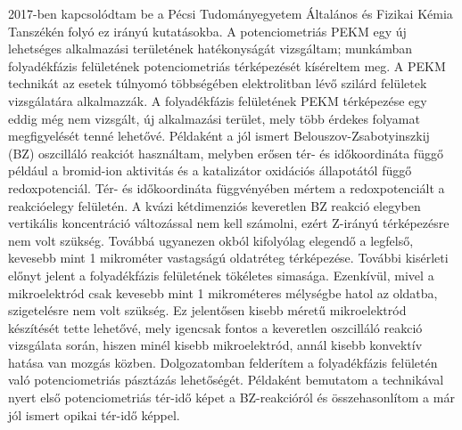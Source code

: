 2017-ben kapcsolódtam be a Pécsi Tudományegyetem Általános és Fizikai Kémia Tanszékén folyó ez irányú kutatásokba. A potenciometriás PEKM egy új lehetséges alkalmazási területének hatékonyságát vizsgáltam; munkámban folyadékfázis felületének potenciometriás térképezését kíséreltem meg. A PEKM technikát az esetek túlnyomó többségében elektrolitban lévő szilárd felületek vizsgálatára alkalmazzák. A folyadékfázis felületének PEKM térképezése egy eddig még nem vizsgált, új alkalmazási terület, mely több érdekes folyamat megfigyelését tenné lehetővé. Példaként a jól ismert Belouszov-Zsabotyinszkij (BZ) oszcilláló reakciót használtam, melyben erősen tér- és időkoordináta függő például a bromid-ion aktivitás és a katalizátor oxidációs állapotától függő redoxpotenciál. Tér- és időkoordináta függvényében mértem a redoxpotenciált a reakcióelegy felületén. A kvázi kétdimenziós keveretlen BZ reakció elegyben vertikális koncentráció változással nem kell számolni, ezért Z-irányú térképezésre nem volt szükség. Továbbá ugyanezen okból kifolyólag elegendő a legfelső, kevesebb mint 1 mikrométer vastagságú oldatréteg térképezése. További kisérleti előnyt jelent a folyadékfázis felületének tökéletes simasága. Ezenkívül, mivel a mikroelektród csak kevesebb mint 1 mikrométeres mélységbe hatol az oldatba, szigetelésre nem volt szükség. Ez jelentősen kisebb méretű mikroelektród készítését tette lehetővé, mely igencsak fontos a keveretlen oszcilláló reakció vizsgálata során, hiszen minél kisebb mikroelektród, annál kisebb konvektív hatása van mozgás közben. Dolgozatomban felderítem a folyadékfázis felületén való potenciometriás pásztázás lehetőségét. Példaként bemutatom a technikával nyert első potenciometriás tér-idő képet a BZ-reakcióról és összehasonlítom a már jól ismert opikai tér-idő képpel.
